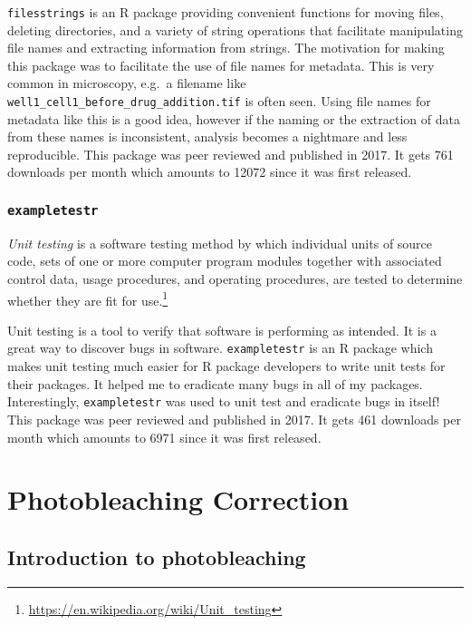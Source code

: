 \documentclass[12pt,]{book}
\let\rmarkdownfootnote\footnote%
\def\footnote{\protect\rmarkdownfootnote}
\theoremstyle{definition}
\theoremstyle{definition}
\theoremstyle{definition}
\theoremstyle{remark}
\let\BeginKnitrBlock\begin \let\EndKnitrBlock\end
\begin{document}
\texttt{filesstrings} is an R package providing convenient functions for
moving files, deleting directories, and a variety of string operations
that facilitate manipulating file names and extracting information from
strings. The motivation for making this package was to facilitate the
use of file names for metadata. This is very common in microscopy,
e.g.~a filename like \texttt{well1\_cell1\_before\_drug\_addition.tif}
is often seen. Using file names for metadata like this is a good idea,
however if the naming or the extraction of data from these names is
inconsistent, analysis becomes a nightmare and less reproducible. This
package was peer reviewed and published in 2017.\citep{filesstrings} It
gets 761 downloads per month which amounts to 12072 since it was first
released.

\subsection{\texorpdfstring{\texttt{exampletestr}}{exampletestr}}\label{exampletestr}

\BeginKnitrBlock{definition}
\protect\hypertarget{def:unnamed-chunk-19}{}{\label{def:unnamed-chunk-19}
}\emph{Unit testing} is a software testing method by which individual
units of source code, sets of one or more computer program modules
together with associated control data, usage procedures, and operating
procedures, are tested to determine whether they are fit for
use.\footnote{\url{https://en.wikipedia.org/wiki/Unit_testing}}
\EndKnitrBlock{definition}

Unit testing is a tool to verify that software is performing as
intended. It is a great way to discover bugs in software.
\texttt{exampletestr} is an R package which makes unit testing much
easier for R package developers to write unit tests for their packages.
It helped me to eradicate many bugs in all of my packages.
Interestingly, \texttt{exampletestr} was used to unit test and eradicate
bugs in itself! This package was peer reviewed and published in
2017.\citep{exampletestr} It gets 461 downloads per month which amounts
to 6971 since it was first released.

\chapter{Photobleaching Correction}\label{photobleaching-correction}

\section{Introduction to
photobleaching}\label{introduction-to-photobleaching}
\end{document}
